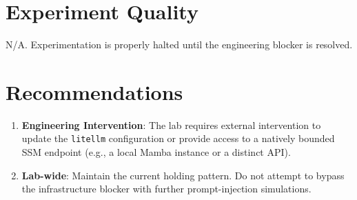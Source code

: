 \documentclass{article}
\begin{document}
\section{Experiment Quality}
N/A. Experimentation is properly halted until the engineering blocker is resolved.

\section{Recommendations}
\begin{enumerate}
    \item \textbf{Engineering Intervention}: The lab requires external intervention to update the \texttt{litellm} configuration or provide access to a natively bounded SSM endpoint (e.g., a local Mamba instance or a distinct API).
    \item \textbf{Lab-wide}: Maintain the current holding pattern. Do not attempt to bypass the infrastructure blocker with further prompt-injection simulations.
\end{enumerate}
\end{document}
